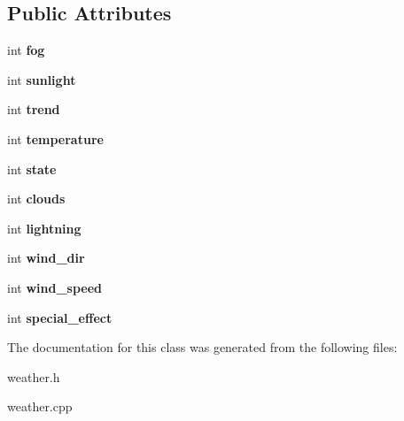 \subsection*{Public Attributes}
\begin{DoxyCompactItemize}
\item 
\hypertarget{classWeather_a01aefe5b420d80cfad47e9f284d79626}{int {\bfseries fog}}\label{classWeather_a01aefe5b420d80cfad47e9f284d79626}

\item 
\hypertarget{classWeather_ab40997fa4f5013a26576cd73f9e8befa}{int {\bfseries sunlight}}\label{classWeather_ab40997fa4f5013a26576cd73f9e8befa}

\item 
\hypertarget{classWeather_aa35eac1fe8923f53dd13deec24b316c4}{int {\bfseries trend}}\label{classWeather_aa35eac1fe8923f53dd13deec24b316c4}

\item 
\hypertarget{classWeather_a9c591d262445fa81b2db1ed42c10243b}{int {\bfseries temperature}}\label{classWeather_a9c591d262445fa81b2db1ed42c10243b}

\item 
\hypertarget{classWeather_a4c7ab25a82283c8c7a2b3b952f2b3774}{int {\bfseries state}}\label{classWeather_a4c7ab25a82283c8c7a2b3b952f2b3774}

\item 
\hypertarget{classWeather_a9f547babbc20e54f3b2867b90588b5e4}{int {\bfseries clouds}}\label{classWeather_a9f547babbc20e54f3b2867b90588b5e4}

\item 
\hypertarget{classWeather_a2e6daf8e8ebd008546e41d16899b38fc}{int {\bfseries lightning}}\label{classWeather_a2e6daf8e8ebd008546e41d16899b38fc}

\item 
\hypertarget{classWeather_a6954a350137a1f71caf7a497a9151268}{int {\bfseries wind\-\_\-dir}}\label{classWeather_a6954a350137a1f71caf7a497a9151268}

\item 
\hypertarget{classWeather_a52ed27651f257fccf8781875231bdb6e}{int {\bfseries wind\-\_\-speed}}\label{classWeather_a52ed27651f257fccf8781875231bdb6e}

\item 
\hypertarget{classWeather_aaf92329f8976174333b59190d6f7d394}{int {\bfseries special\-\_\-effect}}\label{classWeather_aaf92329f8976174333b59190d6f7d394}

\end{DoxyCompactItemize}


The documentation for this class was generated from the following files\-:\begin{DoxyCompactItemize}
\item 
weather.\-h\item 
weather.\-cpp\end{DoxyCompactItemize}
